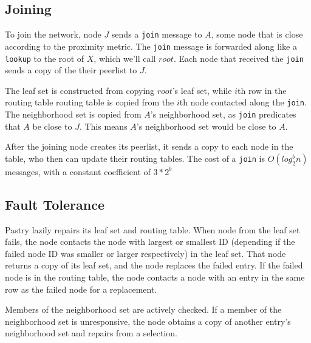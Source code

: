 \subsection*{Joining}
To join the network, node $J$ sends a \texttt{join} message to $A$, some node that is close according to the proximity metric.
The \texttt{join} message is forwarded along like a \texttt{lookup} to the root of $X$, which we'll call $root$.
Each node that received the \texttt{join} sends a copy of the their peerlist to $J$.

The leaf set is constructed from copying $root$'s leaf set, while $i$th row in the routing table routing table is copied from the $i$th node contacted along the \texttt{join}.
The neighborhood set is copied from $A$'s neighborhood set, as \texttt{join} predicates that $A$ be close to $J$.
This means $A$'s neighborhood set would be close to $A$. 

After the joining node creates its peerlist, it sends a copy to each node in the table, who then can update their routing tables.  
The cost of a \texttt{join} is $O(log_{2}^{b} n)$ messages,  with  a constant  coefficient  of $3*2^{b}$




\subsection*{Fault Tolerance}
Pastry lazily repairs its leaf set and routing table.
When node from the leaf set fails, the node contacts the node with largest or smallest ID (depending if the failed node ID was smaller or larger respectively) in the leaf set.
That node returns a copy of its leaf set, and the node replaces the failed entry.
If the failed node is in the routing table, the node contacts a node with an entry in the same row as the failed node for a replacement.

Members of the neighborhood set are actively checked.
If a member of the neighborhood set is unresponsive, the node obtains a copy of another entry's neighborhood set and repairs from a selection.










